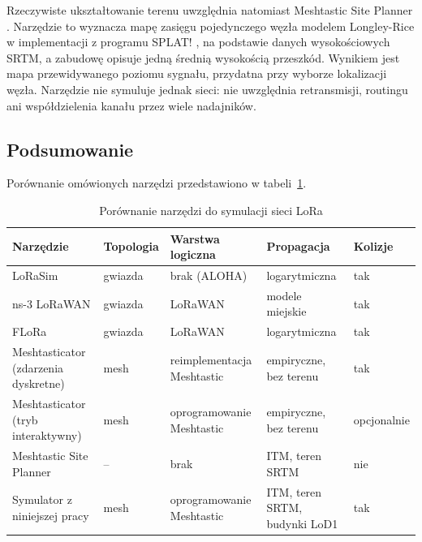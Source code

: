 \documentclass[12pt,a4paper,twoside]{report}
\theoremstyle{definition} %
\begin{document}
Rzeczywiste ukształtowanie terenu uwzględnia natomiast Meshtastic Site Planner \cite{site_planner}. Narzędzie to wyznacza mapę zasięgu pojedynczego węzła modelem Longley-Rice w implementacji z programu SPLAT! \cite{splat}, na podstawie danych wysokościowych SRTM, a zabudowę opisuje jedną średnią wysokością przeszkód. Wynikiem jest mapa przewidywanego poziomu sygnału, przydatna przy wyborze lokalizacji węzła. Narzędzie nie symuluje jednak sieci: nie uwzględnia retransmisji, routingu ani współdzielenia kanału przez wiele nadajników.

\subsection{Podsumowanie}

Porównanie omówionych narzędzi przedstawiono w tabeli~\ref{tab:symulatory}.

\begin{table}[ht]
\centering
\caption{Porównanie narzędzi do symulacji sieci LoRa}
\label{tab:symulatory}
\footnotesize
\begin{tabular}{|>{\raggedright\arraybackslash}p{2.6cm}|>{\raggedright\arraybackslash}p{1.7cm}|>{\raggedright\arraybackslash}p{2.6cm}|>{\raggedright\arraybackslash}p{2.6cm}|>{\raggedright\arraybackslash}p{1.9cm}|}
\hline
\textbf{Narzędzie} & \textbf{Topologia} & \textbf{Warstwa logiczna} & \textbf{Propagacja} & \textbf{Kolizje} \\
\hline
LoRaSim & gwiazda & brak (ALOHA) & logarytmiczna & tak \\ \hline
ns-3 LoRaWAN & gwiazda & LoRaWAN & modele miejskie & tak \\ \hline
FLoRa & gwiazda & LoRaWAN & logarytmiczna & tak \\ \hline
Meshtasticator (zdarzenia dyskretne) & mesh & reimplementacja Meshtastic & empiryczne, bez terenu & tak \\ \hline
Meshtasticator (tryb interaktywny) & mesh & oprogramowanie Meshtastic & empiryczne, bez terenu & opcjonalnie \\ \hline
Meshtastic Site Planner & -- & brak & ITM, teren SRTM & nie \\ \hline
Symulator z niniejszej pracy & mesh & oprogramowanie Meshtastic & ITM, teren SRTM, budynki LoD1 & tak \\ \hline
\end{tabular}
\end{table}
\end{document}
